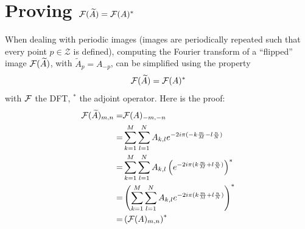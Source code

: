 \FloatBarrier

\section{Proving ${\mathcal F}(\widetilde{A}) = {\mathcal F}(A)^*$}\label{sec_proof_fourier_flip_adjoint}
When dealing with periodic images (images are periodically repeated such that every point $p \in \mathcal{Z}$ is defined), computing the Fourier transform of a “flipped” image ${\mathcal F}(\widetilde{A})$, with $\widetilde{A}_p = A_{-p}$, can be simplified using the property
\begin{equation*}
{\mathcal F}(\widetilde{A}) = {\mathcal F}(A)^*
\end{equation*}
with ${\mathcal F}$ the \ac{DFT}, $^*$ the adjoint operator. Here is the proof:
\begin{align*}
{\mathcal F}({\widetilde{A}})_{m,n} =& {\mathcal F}(A)_{-m,-n} \\
=& \sum_{k=1}^M \sum_{l=1}^N A_{k,l} e^{-2i\pi (-k\frac{m}{M}-l \frac{n}{N})}\\
=& \sum_{k=1}^M \sum_{l=1}^N A_{k,l} \left( e^{-2i\pi (k\frac{m}{M}+l \frac{n}{N})} \right)^*\\
=& \left( \sum_{k=1}^M \sum_{l=1}^N A_{k,l} e^{-2i\pi (k\frac{m}{M}+l \frac{n}{N})} \right)^*\\
=& \left( {\mathcal F}(A)_{m,n} \right)^*
\end{align*}



\printglossary
{\let\clearpage\relax \printacronyms}
\printbibliography[title=References]






